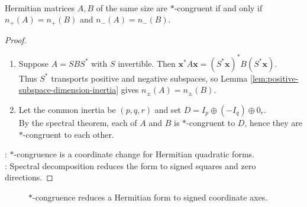 \begin{theorem} \label{thm:sylvester-inertia-theorem-hermitian} \\
Hermitian matrices $A,B$ of the same size are $*$-congruent if and only if $n_+(A)=n_+(B)$ and $n_-(A)=n_-(B)$.
\begin{proof}
\begin{enumerate}[label=\roman*.]
\setlength{\itemsep}{0pt}
\item[$(\Rightarrow)$] Suppose $A=SBS^*$ with $S$ invertible. Then $\mathbf{x}^*A\mathbf{x}=(S^*\mathbf{x})^*B(S^*\mathbf{x})$.\\
Thus $S^*$ transports positive and negative subspaces, so Lemma \ref{lem:positive-subspace-dimension-inertia} gives $n_\pm(A)=n_\pm(B)$.
\item[$(\Leftarrow)$] Let the common inertia be $(p,q,r)$ and set $D=I_p\oplus(-I_q)\oplus0_r$.\\
By the spectral theorem, each of $A$ and $B$ is $*$-congruent to $D$, hence they are $*$-congruent to each other.
\end{enumerate}
: $*$-congruence is a coordinate change for Hermitian quadratic forms.\\
: Spectral decomposition reduces the form to signed squares and zero directions.
\end{proof}
\end{theorem}

\begin{figure}[H]
  \centering
  
  \caption{$*$-congruence reduces a Hermitian form to signed coordinate axes.}
  \label{fig:sylvester-inertia-congruence}
\end{figure}
